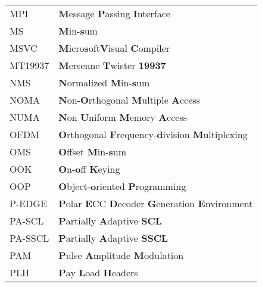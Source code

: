 \begin{center}
\begin{longtable}{ p{}  p{} }
MPI         & \textbf{M}essage \textbf{P}assing \textbf{I}nterface                                                            \\
MS          & \textbf{M}in-\textbf{s}um                                                                                       \\
MSVC        & \textbf{M}icro\textbf{s}oft\R \textbf{V}isual \textbf{C}ompiler                                                 \\
MT19937     & \textbf{M}ersenne \textbf{T}wister \textbf{19937}                                                               \\
NMS         & \textbf{N}ormalized \textbf{M}in-\textbf{s}um                                                                   \\
NOMA        & \textbf{N}on-\textbf{O}rthogonal \textbf{M}ultiple \textbf{A}ccess                                              \\
NUMA        & \textbf{N}on \textbf{U}niform \textbf{M}emory \textbf{A}ccess                                                   \\
OFDM        & \textbf{O}rthogonal \textbf{F}requency-\textbf{d}ivision \textbf{M}ultiplexing                                  \\
OMS         & \textbf{O}ffset \textbf{M}in-\textbf{s}um                                                                       \\
OOK         & \textbf{O}n-\textbf{o}ff \textbf{K}eying                                                                        \\
OOP         & \textbf{O}bject-\textbf{o}riented \textbf{P}rogramming                                                          \\
P-EDGE      & \textbf{P}olar \textbf{E}CC \textbf{D}ecoder \textbf{G}eneration \textbf{E}nvironment                           \\
PA-SCL      & \textbf{P}artially \textbf{A}daptive \textbf{SCL}                                                               \\
PA-SSCL     & \textbf{P}artially \textbf{A}daptive \textbf{SSCL}                                                              \\
PAM         & \textbf{P}ulse \textbf{A}mplitude \textbf{M}odulation                                                           \\
PLH         & \textbf{P}ay \textbf{L}oad \textbf{H}eaders                                                                     \\

\end{longtable}
\end{center}
